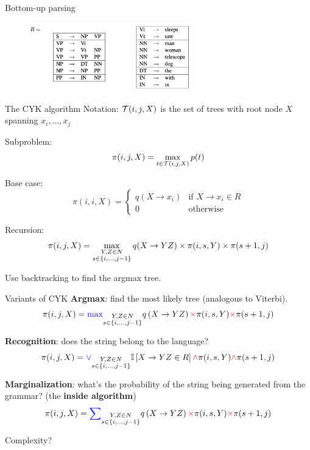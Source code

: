 \documentclass[usenames,dvipsnames,notes]{beamer}
\begin{document}
\begin{frame}
    {Bottom-up parsing}
    \begin{figure}
        \includegraphics[height=3cm]{figures/toy-cfg-2.png}
    \end{figure}
    \vspace{14em}
\end{frame}

\begin{frame}
    {The CYK algorithm}
    Notation: $\mathcal{T}(i,j,X)$ is the set of trees with root node $X$ spanning $x_i,\ldots,x_j$ 

    Subproblem:
    $$\pi(i,j,X) = \max_{t\in\mathcal{T}(i,j,X)} p(t)$$

    Base case:
    $$
    \pi(i,i,X) = \begin{cases}
        q(X\rightarrow x_i) & \text{if } X\rightarrow x_i \in R \\
        0 & \text{otherwise}
    \end{cases}
    $$

    Recursion:
    $$
    \pi(i,j,X) = \max_{\substack{Y,Z \in N\\ s\in\left\{ i,\ldots,j-1 \right\}}}
    q(X\rightarrow YZ)\times \pi(i,s,Y) \times \pi(s+1, j)
    $$

    Use backtracking to find the argmax tree.
\end{frame}

\begin{frame}
    {Variants of CYK}
    \textbf{Argmax}: find the most likely tree (analogous to Viterbi).
    $$
    \pi(i,j,X) = {\color{blue}\max}_{\substack{Y,Z\in N\\ s\in\left\{ i,\ldots,j-1 \right\}}}
    q\left( X\rightarrow YZ \right) {\color{red}\times} \pi(i,s,Y) {\color{red}\times} \pi(s+1, j)
    $$

    \textbf{Recognition}: does the string belong to the language?
    $$
    \pi(i,j,X) = {\color{blue}\vee}_{\substack{Y,Z\in N\\ s\in\left\{ i,\ldots,j-1 \right\}}}
    \mathbb{I}\left[ X\rightarrow YZ\in R \right] {\color{red}\wedge} \pi(i,s,Y) {\color{red}\wedge} \pi(s+1, j)
    $$

    \textbf{Marginalization}: what's the probability of the string being generated from the grammar? (the \textbf{inside algorithm})
    $$
    \pi(i,j,X) = {\color{blue}\sum}_{\substack{Y,Z\in N\\ s\in\left\{ i,\ldots,j-1 \right\}}}
    q\left( X\rightarrow YZ \right) {\color{red}\times} \pi(i,s,Y) {\color{red}\times} \pi(s+1, j)
    $$

    Complexity?
\end{frame}
\end{document}
